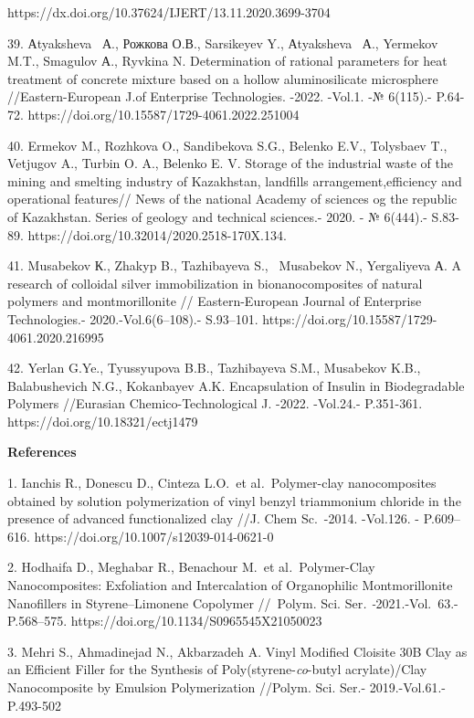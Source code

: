 https://dx.doi.org/10.37624/IJERT/13.11.2020.3699-3704

39. Аtyaksheva~ А., Рожкова О.В., Sarsikeyev Y., Аtyaksheva~ А.,
Yermekov M.T., Smagulov А., Ryvkina N. Determination of rational
parameters for heat treatment of concrete mixture based on a hollow
aluminosilicate microsphere //Eastern-European J.of Enterprise
Technologies. -2022. -Vol.1. -№ 6(115).- P.64-72.
https://doi.org/10.15587/1729-4061.2022.251004

40. Ermekov M., Rozhkova O., Sandibekova S.G., Belenko E.V., Tolysbaev
T., Vetjugov A., Turbin O. A., Belenko E. V. Storage of the industrial
waste of the mining and smelting industry of Kazakhstan, landfills
arrangement,efficiency and operational features// News of the national
Academy of sciences og the republic of Kazakhstan. Series of geology and
technical sciences.- 2020. - № 6(444).- S.83-89.
https://doi.org/10.32014/2020.2518-170X.134.

41. Musabekov К., Zhakyp B., Tazhibayeva S., ~Musabekov N., Yergaliyeva
А. A research of colloidal silver immobilization in bionanocomposites of
natural polymers and montmorillonite // Eastern-European Journal of
Enterprise Technologies.- 2020.-Vol.6(6--108).- S.93--101.
https://doi.org/10.15587/1729-4061.2020.216995

42. Yerlan G.Ye., Tyussyupova B.B., Tazhibayeva S.M., Musabekov K.B.,
Balabushevich N.G., Kokanbayev A.K. Encapsulation of Insulin in
Biodegradable Polymers //Eurasian Chemico-Technological J. -2022.
-Vol.24.- P.351-361. https://doi.org/10.18321/ectj1479

{\bfseries References}

1. Ianchis R., Donescu D., Cinteza L.O.~et al\emph{.}~Polymer-clay
nanocomposites obtained by solution polymerization of vinyl benzyl
triammonium chloride in the presence of advanced functionalized clay
//J. Chem Sc.~-2014. -Vol.126. - P.609--616.
https://doi.org/10.1007/s12039-014-0621-0

2. Hodhaifa D., Meghabar R., Benachour M.~et al\emph{.}~Polymer-Clay
Nanocomposites: Exfoliation and Intercalation of Organophilic
Montmorillonite Nanofillers in Styrene--Limonene Copolymer //~Polym.
Sci. Ser\emph{. -}2021.-Vol.~63.- P.568--575.
https://doi.org/10.1134/S0965545X21050023

3. Mehri S., Ahmadinejad N., Akbarzadeh A. Vinyl Modified Cloisite 30B
Clay as an Efficient Filler for the Synthesis of
Poly(styrene-\emph{co}-butyl acrylate)/Clay Nanocomposite by Emulsion
Polymerization //Polym. Sci. Ser.- 2019.-Vol.61.-P.493-502

